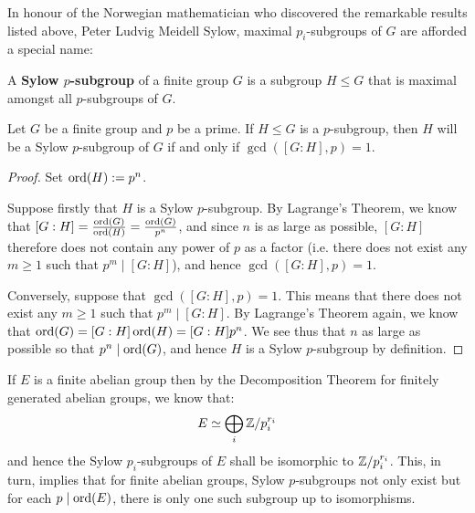         In honour of the Norwegian mathematician who discovered the remarkable results listed above, Peter Ludvig Meidell Sylow, maximal $p_i$-subgroups of $G$ are afforded a special name:
        \begin{definition} \label{def: sylow_subgroups}
            A \textbf{Sylow $p$-subgroup} of a finite group $G$ is a subgroup $H \leq G$ that is maximal amongst all $p$-subgroups of $G$.
        \end{definition}
        \begin{lemma} \label{lemma: maximality_criterion_for_p_subgroups}
            Let $G$ be a finite group and $p$ be a prime. If $H \leq G$ is a $p$-subgroup, then $H$ will be a Sylow $p$-subgroup of $G$ if and only if $\gcd( [G : H], p ) = 1$. 
        \end{lemma}
            \begin{proof}
                Set $\operatorname{ord}(H) := p^n$.
            
                Suppose firstly that $H$ is a Sylow $p$-subgroup. By Lagrange's Theorem, we know that $[G : H] = \frac{\operatorname{ord}(G)}{\operatorname{ord}(H)} = \frac{\operatorname{ord}(G)}{p^n}$, and since $n$ is as large as possible, $[G : H]$ therefore does not contain any power of $p$ as a factor (i.e. there does not exist any $m \geq 1$ such that $p^m \mid [G : H]$), and hence $\gcd( [G : H], p ) = 1$.

                Conversely, suppose that $\gcd([G : H], p) = 1$. This means that there does not exist any $m \geq 1$ such that $p^m \mid [G : H]$. By Lagrange's Theorem again, we know that $\operatorname{ord}(G) = [G : H] \operatorname{ord}(H) = [G : H] p^n$. We see thus that $n$ as large as possible so that $p^n \mid \operatorname{ord}(G)$, and hence $H$ is a Sylow $p$-subgroup by definition. 
            \end{proof}
        \begin{example}
            If $E$ is a finite abelian group then by the Decomposition Theorem for finitely generated abelian groups, we know that:
                $$E \simeq \bigoplus_i \mathbb{Z}/p_i^{r_i}$$
            and hence the Sylow $p_i$-subgroups of $E$ shall be isomorphic to $\mathbb{Z}/p_i^{r_i}$. This, in turn, implies that for finite abelian groups, Sylow $p$-subgroups not only exist but for each $p \mid \operatorname{ord}(E)$, there is only one such subgroup up to isomorphisms.
        \end{example}

